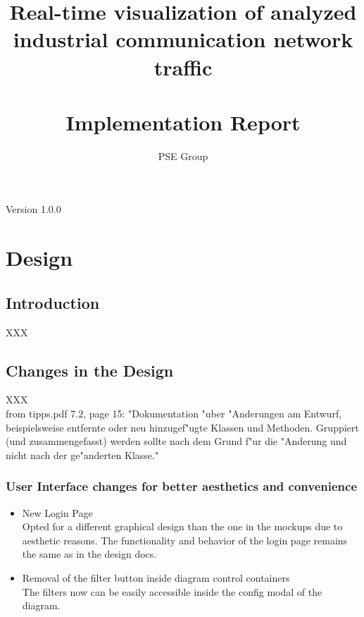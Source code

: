 \documentclass[oneside, english, final]{design}
\author{PSE Group}
\title{Real-time visualization of analyzed industrial communication network traffic\\ \hfill \\Implementation Report}
\begin{document}
\nocite{*}

\setpdf

\maketitle


\hfill

\begin{center}
	\large{Version 1.0.0}
\end{center}


\thispagestyle{empty}
\begin{abstract}
	\thispagestyle{empty}
\end{abstract}

\thispagestyle{empty}
\newpage
\thispagestyle{empty}
\tableofcontents
\cleardoublepage
\setcounter{page}{1}


\section{Design}\label{sec:intro}
\subsection{Introduction}
XXX
\\
\subsection{Changes in the Design}
XXX
\\
from tipps.pdf 7.2, page 15:
"Dokumentation "uber "Anderungen am Entwurf, beispielsweise entfernte oder neu hinzugef"ugte 
Klassen und Methoden. Gruppiert (und zusammengefasst) werden sollte nach dem Grund f"ur
die "Anderung und nicht nach der ge"anderten Klasse."


\subsubsection{User Interface changes for better aesthetics and convenience}
\begin{itemize}
  \item{New Login Page
  \\
    Opted for a different graphical design than the one in the mockups due to aesthetic reasons. The functionality and behavior of the login page remains the same as in the design docs.}
    
  \item{Removal of the filter button inside diagram control containers
  \\
  The filters now can be easily accessible inside the config modal of the diagram.}
\end{itemize}
\end{document}
